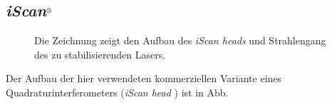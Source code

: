 \subsection{\textit{iScan}$^\text{\textregistered}$}\label{subsec:iScan}
\begin{figure}[h]
 	\centering
	\caption[\textit{iScan head} - Aufbau]{Die Zeichnung zeigt den Aufbau
	des \textit{iScan heads} und Strahlengang des zu
	stabilisierenden Lasers.}\label{fig:iscan_aufbau}
\end{figure}
Der Aufbau der hier verwendeten kommerziellen Variante eines
Quadraturinterferometers (\textit{iScan head} \cite{iscan_hardware_guide}) ist
in Abb.
